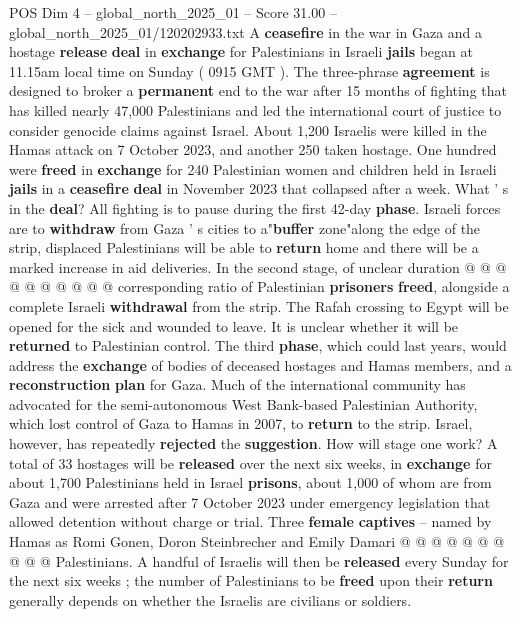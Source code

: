 \begin{textsample}{POS Dim 4 – global\_north\_2025\_01 – Score 31.00 – global\_north\_2025\_01/120202933.txt}  \label{ex:f4_pos_045}
A \textbf{ceasefire} in the war in Gaza and a hostage \textbf{release} \textbf{deal} in \textbf{exchange} for Palestinians in Israeli \textbf{jails} began at 11.15am local time on Sunday ( 0915 GMT ).
The three-phrase \textbf{agreement} is designed to broker a \textbf{permanent} end to the war after 15 months of fighting that has killed nearly 47,000 Palestinians and led the international court of justice to consider genocide claims against Israel.
About 1,200 Israelis were killed in the Hamas attack on 7 October 2023, and another 250 taken hostage.
One hundred were \textbf{freed} in \textbf{exchange} for 240 Palestinian women and children held in Israeli \textbf{jails} in a \textbf{ceasefire} \textbf{deal} in November 2023 that collapsed after a week.
What ' s in the \textbf{deal}?
All fighting is to pause during the first 42-day \textbf{phase}.
Israeli forces are to \textbf{withdraw} from Gaza ' s cities to a"\textbf{buffer} zone"along the edge of the strip, displaced Palestinians will be able to \textbf{return} home and there will be a marked increase in aid deliveries.
In the second stage, of unclear duration @ @ @ @ @ @ @ @ @ @ corresponding ratio of Palestinian \textbf{prisoners} \textbf{freed}, alongside a complete Israeli \textbf{withdrawal} from the strip.
The Rafah crossing to Egypt will be opened for the sick and wounded to leave.
It is unclear whether it will be \textbf{returned} to Palestinian control.
The third \textbf{phase}, which could last years, would address the \textbf{exchange} of bodies of deceased hostages and Hamas members, and a \textbf{reconstruction} \textbf{plan} for Gaza.
Much of the international community has advocated for the semi-autonomous West Bank-based Palestinian Authority, which lost control of Gaza to Hamas in 2007, to \textbf{return} to the strip.
Israel, however, has repeatedly \textbf{rejected} the \textbf{suggestion}.
How will stage one work?
A total of 33 hostages will be \textbf{released} over the next six weeks, in \textbf{exchange} for about 1,700 Palestinians held in Israel \textbf{prisons}, about 1,000 of whom are from Gaza and were arrested after 7 October 2023 under emergency legislation that allowed detention without charge or trial.
Three \textbf{female} \textbf{captives} -- named by Hamas as Romi Gonen, Doron Steinbrecher and Emily Damari @ @ @ @ @ @ @ @ @ @ Palestinians.
A handful of Israelis will then be \textbf{released} every Sunday for the next six weeks ; the number of Palestinians to be \textbf{freed} upon their \textbf{return} generally depends on whether the Israelis are civilians or soldiers.

\end{textsample}
